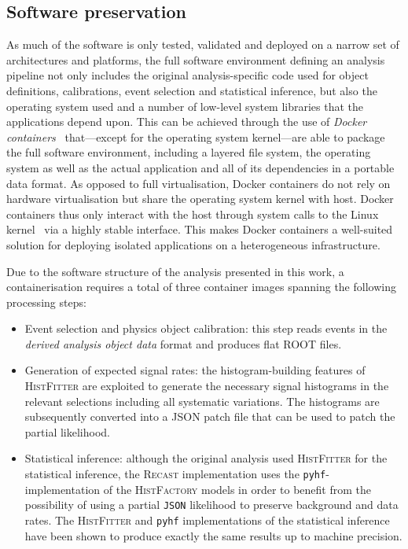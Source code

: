 \subsection{Software preservation}

As much of the software is only tested, validated and deployed on a narrow set of architectures and platforms, the full software environment defining an analysis pipeline not only includes the original analysis-specific code used for object definitions, calibrations, event selection and statistical inference, but also the operating system used and a number of low-level system libraries that the applications depend upon. This can be achieved through the use of \textit{Docker containers}~\cite{docker,Binet:2134524} that---except for the operating system kernel---are able to package the full software environment, including a layered file system, the operating system as well as the actual application and all of its dependencies in a portable data format. As opposed to full virtualisation, Docker containers do not rely on hardware virtualisation but share the operating system kernel with host. Docker containers thus only interact with the host through system calls to the Linux kernel~\cite{ATL-PHYS-PUB-2019-032} via a highly stable interface. This makes Docker containers a well-suited solution for deploying isolated applications on a heterogeneous infrastructure.

Due to the software structure of the analysis presented in this work, a containerisation requires a total of three container images spanning the following processing steps:
\begin{itemize}
	\item Event selection and physics object calibration: this step reads events in the \textit{derived analysis object data} format and produces flat \textsc{ROOT} files.
	\item Generation of expected signal rates: the histogram-building features of \textsc{HistFitter} are exploited to generate the necessary signal histograms in the relevant selections including all systematic variations. The histograms are subsequently converted into a \textsc{JSON} patch file that can be used to patch the partial likelihood.
	\item Statistical inference: although the original analysis used \textsc{HistFitter} for the statistical inference, the \textsc{Recast} implementation uses the \texttt{pyhf}-implementation of the \textsc{HistFactory} models in order to benefit from the possibility of using a partial \texttt{JSON} likelihood to preserve background and data rates. The \textsc{HistFitter} and \texttt{pyhf} implementations of the statistical inference have been shown to produce exactly the same results up to machine precision.
\end{itemize}

